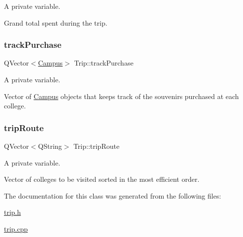 A private variable. 

Grand total spent during the trip. \mbox{\label{class_trip_a1eada5f4eb916b135bd718292775f3b3}} 
\subsubsection{\texorpdfstring{track\+Purchase}{trackPurchase}}
{\footnotesize\ttfamily Q\+Vector$<$\hyperlink{class_campus}{Campus}$>$ Trip\+::track\+Purchase\hspace{0.3cm}{\ttfamily [private]}}



A private variable. 

Vector of \hyperlink{class_campus}{Campus} objects that keeps track of the souvenirs purchased at each college. \mbox{\label{class_trip_a86c5d46368390a7160c2c25064f638ae}} 
\subsubsection{\texorpdfstring{trip\+Route}{tripRoute}}
{\footnotesize\ttfamily Q\+Vector$<$Q\+String$>$ Trip\+::trip\+Route\hspace{0.3cm}{\ttfamily [private]}}



A private variable. 

Vector of colleges to be visited sorted in the most efficient order. 

The documentation for this class was generated from the following files\+:\begin{DoxyCompactItemize}
\item 
\hyperlink{trip_8h}{trip.\+h}\item 
\hyperlink{trip_8cpp}{trip.\+cpp}\end{DoxyCompactItemize}
